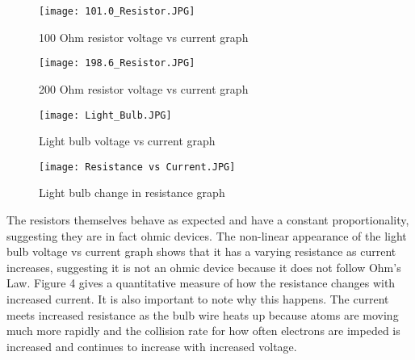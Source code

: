 \documentclass[12pt, letterpaper]{article}
\begin{document}
\begin{figure}[h]
    \centering
    \texttt{[image: 101.0\_Resistor.JPG]}
    \caption{100 Ohm resistor voltage vs current graph}
\end{figure}
\begin{figure}[h!]
    \centering
    \texttt{[image: 198.6\_Resistor.JPG]}
    \caption{200 Ohm resistor voltage vs current graph}
\end{figure}
\begin{figure}[t!]
    \centering
    \texttt{[image: Light\_Bulb.JPG]}
    \caption{Light bulb voltage vs current graph}
\end{figure}
\begin{figure}[t!]
    \centering
    \texttt{[image: Resistance vs Current.JPG]}
    \caption{Light bulb change in resistance graph}
\end{figure}

The resistors themselves behave as expected and have a constant proportionality, suggesting they are in fact ohmic devices. The non-linear appearance of the light bulb voltage vs current graph shows that it has a varying resistance as current increases, suggesting it is not an ohmic device because it does not follow Ohm's Law. Figure 4 gives a quantitative measure of how the resistance changes with increased current. It is also important to note why this happens. The current meets increased resistance as the bulb wire heats up because atoms are moving much more rapidly and the collision rate for how often electrons are impeded is increased and continues to increase with increased voltage. 
\end{document}
